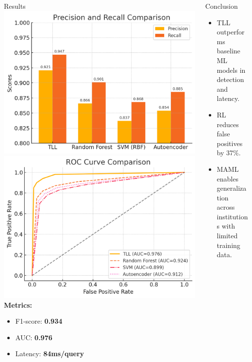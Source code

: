 \documentclass[final]{beamer}
\begin{document}
\begin{frame}[t]
\begin{columns}[t]
\begin{column}{0.32\textwidth}
\begin{block}{Results}
\includegraphics[width=\linewidth]{images/precision_recall_bar.png}
\includegraphics[width=\linewidth]{images/roc_curve_tll.png}
\textbf{Metrics:}
\begin{itemize}
    \item F1-score: \textbf{0.934}
    \item AUC: \textbf{0.976}
    \item Latency: \textbf{84ms/query}
\end{itemize}
\end{block}
\end{column}

\begin{column}{0.32\textwidth}
\begin{block}{Conclusion}
\begin{itemize}
    \item TLL outperforms baseline ML models in detection and latency.
    \item RL reduces false positives by 37\%.
    \item MAML enables generalization across institutions with limited training data.
\end{itemize}
\end{block}


\end{column}
\end{columns}
\end{frame}
\end{document}
